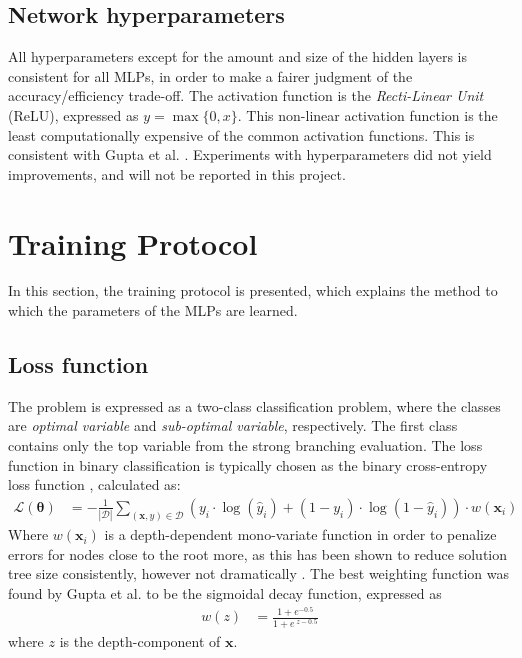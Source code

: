 \subsection{Network hyperparameters}

All hyperparameters except for the amount and size of the hidden layers is consistent for all \gls{MLP}s, in order to make a fairer judgment of the accuracy/efficiency trade-off. The activation function is the \textit{Recti-Linear Unit} (ReLU), expressed as $y = \max \{ 0, x\}$. This non-linear activation function is the least computationally expensive of the common activation functions. This is consistent with Gupta et al. \cite{gupta2020hybrid}. Experiments with hyperparameters did not yield improvements, and will not be reported in this project. 


\section{Training Protocol}\label{sec:trainingprotocol}

In this section, the training protocol is presented, which explains the method to which the parameters of the \gls{MLP}s are learned.


\subsection{Loss function}

The problem is expressed as a two-class classification problem, where the classes are \textit{optimal variable} and \textit{sub-optimal variable}, respectively. The first class contains only the top variable from the strong branching evaluation. The loss function in binary classification is typically chosen as the binary cross-entropy loss function \cite{goodfellow2016deep}, calculated as:
\begin{align}
    \bm{\mathcal{L}}(\bm{\theta}) &= - \frac{1}{|\mathcal{D}|}\sum_{(\bm{x}, y) \in \mathcal{D}} \left( y_i \cdot \log( \hat y_i) + (1-y_i) \cdot \log(1 - \hat y_i) \right)\cdot w(\bm{x}_i)
\end{align}
Where $w(\bm{x}_i)$ is a depth-dependent mono-variate function in order to penalize errors for nodes close to the root more, as this has been shown to reduce solution tree size consistently, however not dramatically \cite{gupta2020hybrid}. The best weighting function was found by Gupta et al. \cite{gupta2020hybrid} to be the sigmoidal decay function, expressed as
%
\begin{align}
    w(z) &= \frac{1+e^{-0.5}}{1+e^{\; z-0.5}}
\end{align}
%
where $z$ is the depth-component of $ \bm{x} $.

